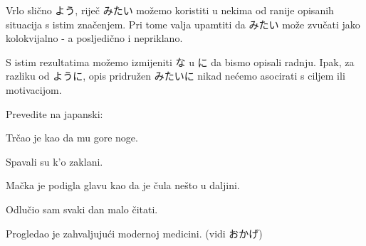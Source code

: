 	
	Vrlo slično よう, riječ みたい možemo koristiti u nekima od ranije opisanih situacija s istim značenjem. Pri tome valja upamtiti da みたい može zvučati jako kolokvijalno - a posljedično i nepriklano.
	
	\begin{reibun}
	\end{reibun}

	
	S istim rezultatima možemo izmijeniti な u に da bismo opisali radnju. Ipak, za razliku od ように, opis pridružen みたいに nikad nećemo asocirati s ciljem ili motivacijom.
	
	\newpage
	
	\begin{mondai}{Prevedite na japanski:}
		\item Trčao je kao da mu gore noge.
		\item Spavali su k'o zaklani.
		\item Mačka je podigla glavu kao da je čula nešto u daljini.
		\item Odlučio sam svaki dan malo čitati.
		\item Progledao je zahvaljujući modernoj medicini. (vidi おかげ)
	\end{mondai}
